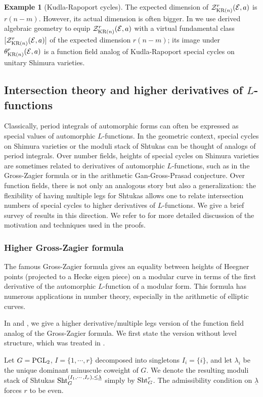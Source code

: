 \documentclass[11pt]{amsart}
\numberwithin{equation}{section}
\theoremstyle{plain}
\theoremstyle{definition}
\newtheorem{exam}[subsubsection]{Example}
\newcommand\cE{\mathcal{E}}
\newcommand\cZ{\mathcal{Z}}
\newcommand\Sht{\textup{Sht}}
\newcommand\PGL{\textup{PGL}}
\newcommand\un{\underline}
\newcommand\sss{\subsubsection}
\renewcommand{\th}{\theta}
\renewcommand{\l}{\lambda}
\newcommand\KR{\textup{KR}}
\begin{document}
\begin{exam}[Kudla-Rapoport cycles]
The expected dimension of $\cZ^{r}_{\KR(n)}(\cE,a)$ is $r(n-m)$. However, its actual dimension is often bigger. In \cite{FYZ2} we use derived algebraic geometry to equip $\cZ^{r}_{\KR(n)}(\cE,a)$ with a virtual fundamental class $[\cZ^{r}_{\KR(n)}(\cE,a)]$ of the expected dimension $r(n-m)$; its image under $\th^{r}_{\KR(n)}(\cE,a)$ is a function field analog of Kudla-Rapoport special cycles on unitary Shimura varieties.
\end{exam}



\subsection{Intersection theory and higher derivatives of $L$-functions}
Classically, period integrals of automorphic forms can often be expressed as special values of automorphic $L$-functions. In the geometric context, special cycles on Shimura varieties or the moduli stack of Shtukas can be thought of analogs of period integrals. Over number fields, heights of special cycles on Shimura varieties are sometimes related to derivatives of automorphic $L$-functions, such as in the Gross-Zagier formula or in the arithmetic Gan-Gross-Prasad conjecture. Over function fields, there is not only an analogous story but also a generalization: the flexibility of having multiple legs for Shtukas allows one to relate intersection numbers of special cycles to higher derivatives of $L$-functions. We give a brief survey of results in this direction. We refer to \cite{Y-ICM} for more detailed discussion of the motivation and techniques used in the proofs.

\sss{Higher Gross-Zagier formula}

The famous Gross-Zagier formula gives an equality between heights of Heegner points (projected to a Hecke eigen piece) on a modular curve in terms of the first derivative of the automorphic $L$-function of a modular form. This formula has numerous applications in number theory, especially in the arithmetic of elliptic curves. 

In \cite{YZ1} and \cite{YZ2}, we give a higher derivative/multiple legs  version of the function field analog of the Gross-Zagier formula. We first state the version without level structure, which was treated in \cite{YZ1}. 


Let $G=\PGL_{2}$, $I=\{1,\cdots, r\}$ decomposed into singletons $I_{i}=\{i\}$, and let $\l_{i}$ be the unique dominant minuscule coweight of $G$. We denote the resulting moduli stack of Shtukas $\Sht^{(I_{1},\cdots, I_{r}),\le\un\l}_{G}$ simply by $\Sht^{r}_{G}$. The admissibility condition on $\un\l$ forces $r$ to be even.  
\end{document}
